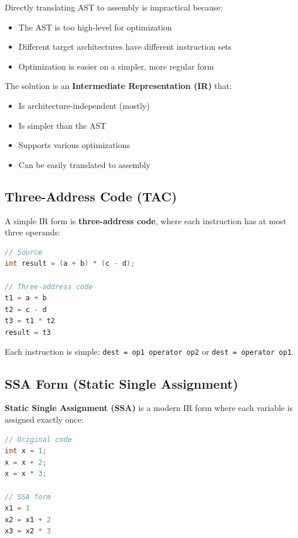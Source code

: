 Directly translating AST to assembly is impractical because:
\begin{itemize}
    \item The AST is too high-level for optimization
    \item Different target architectures have different instruction sets
    \item Optimization is easier on a simpler, more regular form
\end{itemize}

The solution is an \textbf{Intermediate Representation (IR)} that:
\begin{itemize}
    \item Is architecture-independent (mostly)
    \item Is simpler than the AST
    \item Supports various optimizations
    \item Can be easily translated to assembly
\end{itemize}

\subsection{Three-Address Code (TAC)}

A simple IR form is \textbf{three-address code}, where each instruction has at most three operands:

\begin{lstlisting}[language=C]
// Source
int result = (a + b) * (c - d);

// Three-address code
t1 = a + b
t2 = c - d
t3 = t1 * t2
result = t3
\end{lstlisting}

Each instruction is simple: \texttt{dest = op1 operator op2} or \texttt{dest = operator op1}.

\subsection{SSA Form (Static Single Assignment)}

\textbf{Static Single Assignment (SSA)} is a modern IR form where each variable is assigned exactly once:

\begin{lstlisting}[language=C]
// Original code
int x = 1;
x = x + 2;
x = x * 3;

// SSA form
x1 = 1
x2 = x1 + 2
x3 = x2 * 3
\end{lstlisting}

